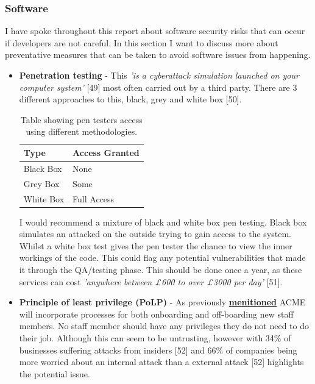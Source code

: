   \subsubsection{Software}
  I have spoke throughout this report about software security risks that can occur if developers are not careful. In this section I want to discuss
  more about preventative measures that can be taken to avoid software issues from happening.

  \begin{itemize}
    \item \textbf{Penetration testing} - This \textit{'is a cyberattack simulation launched on your computer system'} [49] most often carried out by a
    third party. There are 3 different approaches to this, black, grey and white box [50].

    \begin{table}[H]
      \centering
      \begin{tabular}{|l|l|}
        \hline
        \textbf{Type} & \textbf{Access Granted}   \\ \hline
        Black Box     & None                      \\ \hline
        Grey Box      & Some                      \\ \hline
        White Box     & Full Access               \\ \hline
      \end{tabular}
      \caption{Table showing pen testers access using different methodologies.}
    \end{table}

    I would recommend a mixture of black and white box pen testing. Black box simulates an attacked on the outside trying to gain access to the system.
    Whilst a white box test gives the pen tester the chance to view the inner workings of the code. This could flag any potential vulnerabilities that 
    made it through the QA/testing phase. This should be done once a year, as these services can cost 
    \textit{'anywhere between £600 to over £3000 per day'} [51].

    \item \textbf{Principle of least privilege (PoLP)} - As previously \hyperref[sec:PoLP]{\textbf{menitioned}} ACME will incorporate processes for 
    both onboarding and off-boarding new staff members. No staff member should have any privileges they do not need to do their job. Although this can seem 
    to be untrusting, however with 34\% of businesses suffering attacks from insiders [52] and 66\% of companies being more worried about an internal attack 
    than a external attack [52] highlights the potential issue.


\end{itemize}
